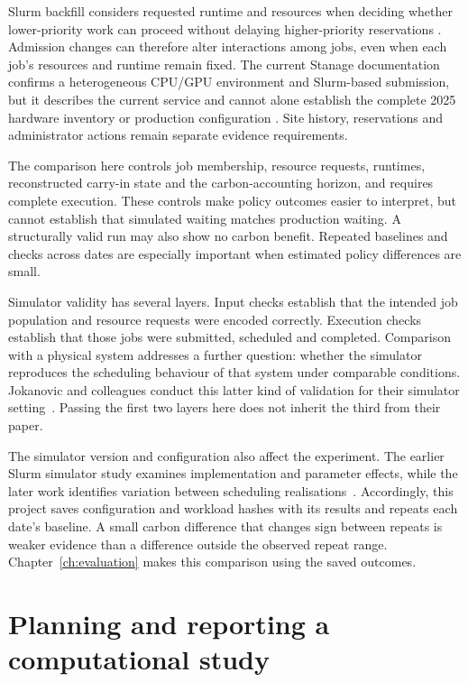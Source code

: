 Slurm backfill considers requested runtime and resources when deciding whether lower-priority work can proceed without delaying higher-priority reservations \citep{schedmdScheduling}. Admission changes can therefore alter interactions among jobs, even when each job's resources and runtime remain fixed. The current Stanage documentation confirms a heterogeneous CPU/GPU environment and Slurm-based submission, but it describes the current service and cannot alone establish the complete 2025 hardware inventory or production configuration \citep{sheffieldStanage}. Site history, reservations and administrator actions remain separate evidence requirements.

The comparison here controls job membership, resource requests, runtimes, reconstructed carry-in state and the carbon-accounting horizon, and requires complete execution. These controls make policy outcomes easier to interpret, but cannot establish that simulated waiting matches production waiting. A structurally valid run may also show no carbon benefit. Repeated baselines and checks across dates are especially important when estimated policy differences are small.

Simulator validity has several layers. Input checks establish that the intended job population and resource requests were encoded correctly. Execution checks establish that those jobs were submitted, scheduled and completed. Comparison with a physical system addresses a further question: whether the simulator reproduces the scheduling behaviour of that system under comparable conditions. Jokanovic and colleagues conduct this latter kind of validation for their simulator setting~\citep{jokanovic2018validation}. Passing the first two layers here does not inherit the third from their paper.

The simulator version and configuration also affect the experiment. The earlier Slurm simulator study examines implementation and parameter effects, while the later work identifies variation between scheduling realisations~\citep{simakov2018simulator,simakov2022accurate}. Accordingly, this project saves configuration and workload hashes with its results and repeats each date's baseline. A small carbon difference that changes sign between repeats is weaker evidence than a difference outside the observed repeat range. Chapter~\ref{ch:evaluation} makes this comparison using the saved outcomes.

\section{Planning and reporting a computational study}

